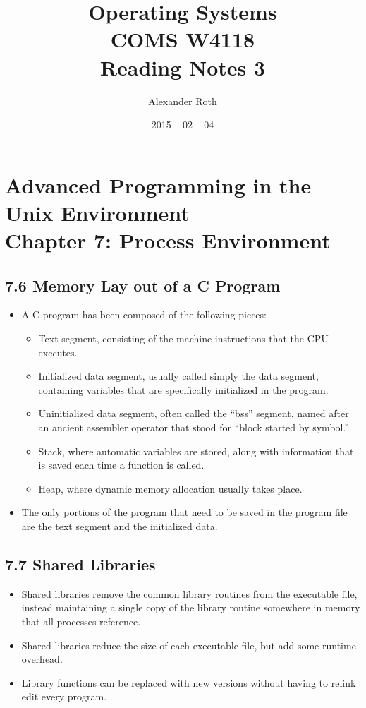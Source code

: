 \documentclass[]{article}
\begin{document}
\newtheorem{thm}{Theorem}
\title{Operating Systems \\ COMS W4118 \\ Reading Notes 3}
\author{Alexander Roth}
\date{2015 -- 02 -- 04}
\maketitle

\section*{Advanced Programming in the Unix Environment \\Chapter 7: Process Environment}
\subsection*{7.6 Memory Lay out of a C Program}
\begin{itemize}
\item A C program has been composed of the following pieces:
\begin{itemize}
\item Text segment, consisting of the machine instructions that the CPU
executes.
\item Initialized data segment, usually called simply the data segment,
containing variables that are specifically initialized in the program.
\item Uninitialized data segment, often called the ``bss'' segment, named after
an ancient assembler operator that stood for ``block started by symbol.''
\item Stack, where automatic variables are stored, along with information that
is saved each time a function is called.
\item Heap, where dynamic memory allocation usually takes place.
\end{itemize}
\item The only portions of the program that need to be saved in the program file
are the text segment and the initialized data.
\end{itemize}

\subsection*{7.7 Shared Libraries}
\begin{itemize}
\item Shared libraries remove the common library routines from the executable
file, instead maintaining a single copy of the library routine somewhere in
memory that all processes reference.
\item Shared libraries reduce the size of each executable file, but add some
runtime overhead.
\item Library functions can be replaced with new versions without having to
relink edit every program.
\end{itemize}
\end{document}
